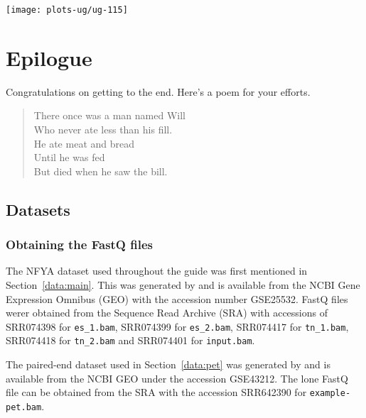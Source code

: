 \documentclass[12pt]{report}
\newcommand{\code}[1]{{\small\texttt{#1}}}
\newenvironment{combox}
{ \begin{shaded}\begin{center}\begin{minipage}[t]{0.95\textwidth} }
{ \end{minipage}\end{center}\end{shaded} }
\begin{document}
\begin{center}
\texttt{[image: plots-ug/ug-115]}
\end{center}



\chapter{Epilogue}

\begin{combox}
Congratulations on getting to the end. Here's a poem for your efforts.
\begin{quote}
There once was a man named Will \\
Who never ate less than his fill. \\
He ate meat and bread \\
Until he was fed \\
But died when he saw the bill. 
\end{quote}
\end{combox}

\section{Datasets}
\label{sec:dataset}

\subsection{Obtaining the FastQ files}
The NFYA dataset used throughout the guide was first mentioned in Section~\ref{data:main}. 
This was generated by \cite{tiwari2012} and is available from the NCBI Gene Expression Omnibus (GEO) with the accession number GSE25532. 
FastQ files werer obtained from the Sequence Read Archive (SRA) with accessions of SRR074398 for \code{es\_1.bam}, SRR074399 for \code{es\_2.bam}, SRR074417 for \code{tn\_1.bam}, SRR074418 for \code{tn\_2.bam} and SRR074401 for \code{input.bam}.

The paired-end dataset used in Section~\ref{data:pet} was generated by \cite{pal2013} and is available from the NCBI GEO under the accession GSE43212.
The lone FastQ file can be obtained from the SRA with the accession SRR642390 for \code{example-pet.bam}.
\end{document}
